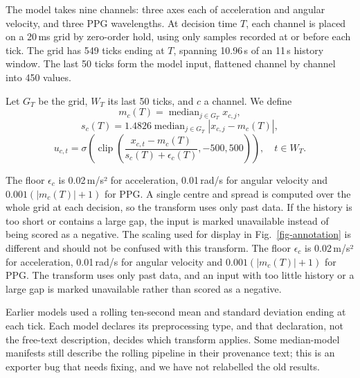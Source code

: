 
\label{causal-detection-and-event-accounting}

\iffull
{}\label{median-scaled-opticalinertial-input}
\fi

The model takes nine channels: three axes each of acceleration and angular velocity, and three PPG wavelengths. At decision time \(T\), each channel is placed on a 20\,ms grid by zero-order hold, using only samples recorded at or before each tick. The grid has 549 ticks ending at \(T\), spanning 10.96\,s of an 11\,s history window. The last 50 ticks form the model input, flattened channel by channel into 450 values.

Let \(G_T\) be the grid, \(W_T\) its last 50 ticks, and \(c\) a channel. We define
\[
m_c(T)=\operatorname{median}_{j\in G_T}x_{c,j},
\]
\[
s_c(T)=1.4826\operatorname{median}_{j\in G_T}|x_{c,j}-m_c(T)|,
\]
\[
u_{c,t}=\sigma\left(\operatorname{clip}\left(\frac{x_{c,t}-m_c(T)}{s_c(T)+\epsilon_c(T)},-500,500\right)\right),\quad t\in W_T.
\]

\iffull
The floor \(\epsilon_c\) is 0.02\,m/s² for acceleration, 0.01\,rad/s for angular velocity and \(0.001(|m_c(T)|+1)\) for PPG. A single centre and spread is computed over the whole grid at each decision, so the transform uses only past data. If the history is too short or contains a large gap, the input is marked unavailable instead of being scored as a negative. The scaling used for display in Fig.~\ref{fig-annotation} is different and should not be confused with this transform.
\else
The floor \(\epsilon_c\) is 0.02\,m/s² for acceleration, 0.01\,rad/s for angular velocity and \(0.001(|m_c(T)|+1)\) for PPG. The transform uses only past data, and an input with too little history or a large gap is marked unavailable rather than scored as a negative.
\fi

\iffull
Earlier models used a rolling ten-second mean and standard deviation ending at each tick. Each model declares its preprocessing type, and that declaration, not the free-text description, decides which transform applies. Some median-model manifests still describe the rolling pipeline in their provenance text; this is an exporter bug that needs fixing, and we have not relabelled the old results.
\fi

